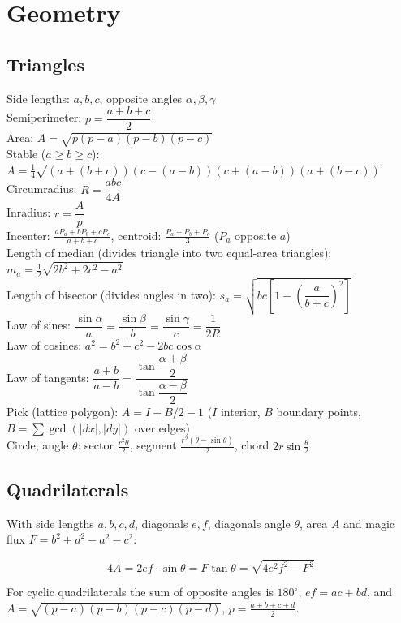 \section{Geometry}

\subsection{Triangles}
Side lengths: $a,b,c$, opposite angles $\alpha,\beta,\gamma$\\
Semiperimeter: $p=\dfrac{a+b+c}{2}$\\
Area: $A=\sqrt{p(p-a)(p-b)(p-c)}$\\
Stable ($a\ge b\ge c$): $A=\frac14\sqrt{(a+(b+c))(c-(a-b))(c+(a-b))(a+(b-c))}$\\
Circumradius: $R=\dfrac{abc}{4A}$\\
Inradius: $r=\dfrac{A}{p}$\\
Incenter: $\frac{aP_a+bP_b+cP_c}{a+b+c}$, centroid: $\frac{P_a+P_b+P_c}{3}$ ($P_a$ opposite $a$)\\
Length of median (divides triangle into two equal-area triangles): $m_a=\tfrac{1}{2}\sqrt{2b^2+2c^2-a^2}$\\
Length of bisector (divides angles in two): $s_a=\sqrt{bc\left[1-\left(\dfrac{a}{b+c}\right)^2\right]}$\\
Law of sines: $\dfrac{\sin\alpha}{a}=\dfrac{\sin\beta}{b}=\dfrac{\sin\gamma}{c}=\dfrac{1}{2R}$\\
Law of cosines: $a^2=b^2+c^2-2bc\cos\alpha$\\
Law of tangents: $\dfrac{a+b}{a-b}=\dfrac{\tan\dfrac{\alpha+\beta}{2}}{\tan\dfrac{\alpha-\beta}{2}}$\\
Pick (lattice polygon): $A = I + B/2 - 1$ ($I$ interior, $B$ boundary points, $B=\sum\gcd(|dx|,|dy|)$ over edges)\\
Circle, angle $\theta$: sector $\frac{r^2\theta}{2}$, segment $\frac{r^2(\theta-\sin\theta)}{2}$, chord $2r\sin\frac{\theta}{2}$

\subsection{Quadrilaterals}

With side lengths $a,b,c,d$, diagonals $e, f$, diagonals angle $\theta$, area $A$ and
magic flux $F=b^2+d^2-a^2-c^2$: 

\[ 4A = 2ef \cdot \sin\theta = F\tan\theta = \sqrt{4e^2f^2-F^2} \]

For cyclic quadrilaterals the sum of opposite angles is $180^\circ$, 
$ef = ac + bd$, and $A = \sqrt{(p-a)(p-b)(p-c)(p-d)}$, $p=\frac{a+b+c+d}{2}$.

